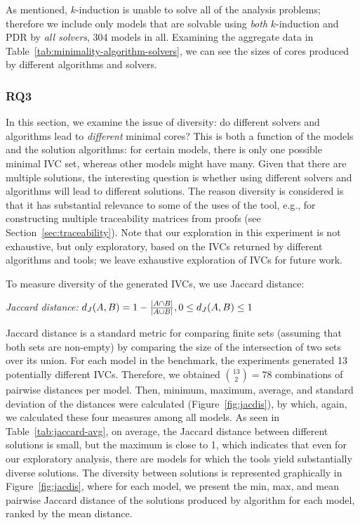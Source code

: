 As mentioned, $k$-induction is unable to solve all of the analysis problems; therefore we include only models that are solvable using {\em both} $k$-induction and PDR by {\em all solvers}, 304 models in all.  Examining the aggregate data in Table~\ref{tab:minimality-algorithm-solvers}, we can see the sizes of cores produced by different algorithms and solvers.
\vspace{0.1in}
\subsubsection{RQ3}
In this section, we examine the issue of diversity:
do different solvers and algorithms lead to {\em different} minimal
cores? This is both a function of the models and the solution
algorithms: for certain models, there is only one possible minimal IVC
set, whereas other models might have many. Given that there are
multiple solutions, the interesting question is whether using
different solvers and algorithms will lead to different solutions.
The reason diversity is considered is that it has substantial relevance to
some of the uses of the tool, e.g., for constructing multiple traceability
matrices from proofs (see Section~\ref{sec:traceability}).
Note that our exploration in this experiment is not
exhaustive, but only exploratory, based on the IVCs returned by different
algorithms and tools; we leave exhaustive exploration of
IVCs for future work.


To measure diversity of the generated IVCs, we use Jaccard distance:
\begin{definition}{\emph{Jaccard distance:}}
  \label{def:dj}
  $d_J(\small{A}, \small{B}) = 1 - \frac{|A \cap B|}{|A \cup B|} ,\\ 0 \leq d_J(\small{A}, \small{B}) \leq 1$
\end{definition}
\noindent Jaccard distance is a standard metric for comparing finite
sets (assuming that both sets are non-empty) by comparing the size of
the intersection of two sets over its union. For each model in the
benchmark, the experiments generated 13 potentially different IVCs. Therefore, we
obtained $\binom{13}{2} = 78$ combinations of pairwise distances per
model. Then, minimum, maximum, average, and standard deviation of the
distances were calculated (Figure~\ref{fig:jacdis}), by which, again,
we calculated these four measures among all models. As seen in
Table~\ref{tab:jaccard-avg}, on average, the Jaccard distance between
different solutions is small, but the maximum is close to 1, which
indicates that even for our exploratory analysis, there are models for
which the tools yield substantially diverse solutions. The diversity
between solutions is represented graphically in
Figure~\ref{fig:jacdis}, where for each model, we present the min,
max, and mean pairwise Jaccard distance of the solutions produced by algorithm
\ucalg for each model, ranked by the mean distance.

